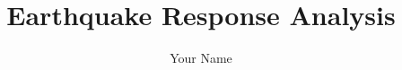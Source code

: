 \documentclass[journal,10pt]{IEEEtran} %
\begin{document}
\title{Earthquake Response Analysis}
\author{Your Name}
\maketitle





\end{document}
